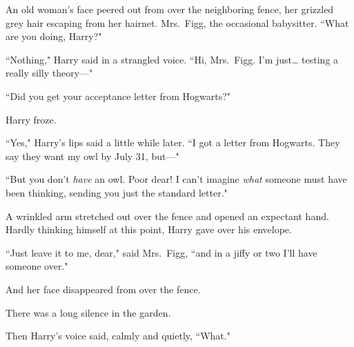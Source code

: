An old woman's face peered out from over the neighboring fence, her grizzled grey hair escaping from her hairnet. Mrs.~Figg, the occasional babysitter. ``What are you doing, Harry?"

``Nothing," Harry said in a strangled voice. ``Hi, Mrs.~Figg.
I'm just{\ldots} testing a really silly theory---"

``Did you get your acceptance letter from Hogwarts?"

Harry froze.

``Yes," Harry's lips said a little while later. ``I got a letter from Hogwarts. They say they want my owl by July 31, but---"

``But you don't \emph{have} an owl. Poor dear! I can't imagine \emph{what} someone must have been thinking, sending you just the standard letter."

A wrinkled arm stretched out over the fence and opened an expectant hand. Hardly thinking himself at this point, Harry gave over his envelope.

``Just leave it to me, dear," said Mrs.~Figg, ``and in a jiffy or two I'll have someone over."

And her face disappeared from over the fence.

There was a long silence in the garden.

Then Harry's voice said, calmly and quietly, ``What."
